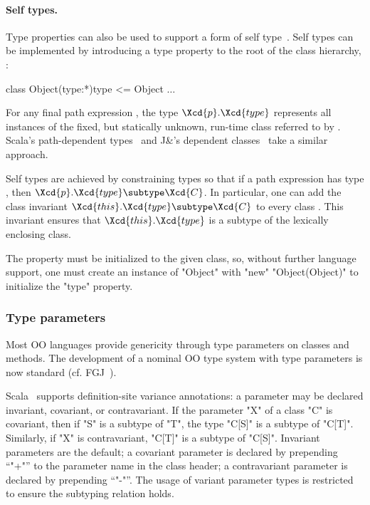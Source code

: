 \paragraph{Self types.}

Type properties can also be used to support a form of self
type~\cite{bruce-binary,bsg95}.
%
Self types can be implemented by introducing a
type property  to the root of the class hierarchy,
:
\begin{xtenmath}
class Object(type:*){type <= Object} { $\dots$ }
\end{xtenmath}

\noindent
For any final path expression , the type
$\Xcd{p}.\Xcd{type}$ represents all instances of the fixed,
but statically unknown, run-time class referred to by .
Scala's path-dependent types~\cite{scala-book} and J\&'s
dependent classes~\cite{nqm06}
take a similar approach.

Self types are achieved by
constraining types so that if a path expression 
has type , then
$\Xcd{p}.\Xcd{type} \subtype \Xcd{C}$.
In particular, one can add the class invariant
$\Xcd{this}.\Xcd{type} \subtype \Xcd{C}$ to every class .
This invariant ensures that
$\Xcd{this}.\Xcd{type}$ is a subtype
of the lexically enclosing class.

The property must be initialized to the given class, so, without
further language support, one must create an instance of
\xcd"Object" with \xcd"new" \xcd"Object(Object)" to initialize
the \xcd"type" property.

\subsubsection{Type parameters}

Most OO languages provide genericity through type parameters on
classes and methods.  The development of a nominal OO type
system with type parameters is now standard (cf.  FGJ~\cite{FJ}).

Scala~\cite{scala} supports definition-site variance
annotations:
a parameter may be declared invariant, covariant, or
contravariant.
If the parameter \xcd"X" of a class \xcd"C" is covariant,
then if \xcd"S" is a subtype of
\xcd"T", the type \xcd"C[S]" is a subtype of \xcd"C[T]".
Similarly, if \xcd"X" is contravariant,
\xcd"C[T]" is a subtype of \xcd"C[S]".
Invariant parameters are the default; a covariant parameter is
declared by prepending ``\xcd"+"'' to the parameter name in the
class header; a contravariant parameter is declared by
prepending ``\xcd"-"''.  The usage of variant parameter types is
restricted to ensure the subtyping relation holds.

